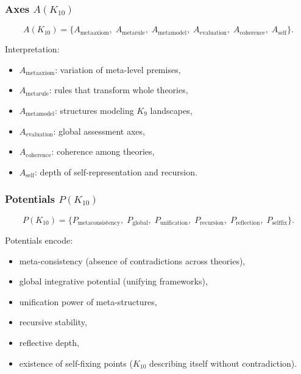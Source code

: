\subsubsection{Axes $A(K_{10})$}

\[
A(K_{10})=
\{
A_{\mathrm{metaaxiom}},\;
A_{\mathrm{metarule}},\;
A_{\mathrm{metamodel}},\;
A_{\mathrm{evaluation}},\;
A_{\mathrm{coherence}},\;
A_{\mathrm{self}}
\}.
\]

Interpretation:
\begin{itemize}
    \item $A_{\mathrm{metaaxiom}}$: variation of meta-level premises,
    \item $A_{\mathrm{metarule}}$: rules that transform whole theories,
    \item $A_{\mathrm{metamodel}}$: structures modeling $K_9$ landscapes,
    \item $A_{\mathrm{evaluation}}$: global assessment axes,
    \item $A_{\mathrm{coherence}}$: coherence among theories,
    \item $A_{\mathrm{self}}$: depth of self-representation and recursion.
\end{itemize}

\subsubsection{Potentials $P(K_{10})$}

\[
P(K_{10})=
\{
P_{\mathrm{metaconsistency}},\;
P_{\mathrm{global}},\;
P_{\mathrm{unification}},\;
P_{\mathrm{recursion}},\;
P_{\mathrm{reflection}},\;
P_{\mathrm{selffix}}
\}.
\]

Potentials encode:
\begin{itemize}
    \item meta-consistency (absence of contradictions across theories),
    \item global integrative potential (unifying frameworks),
    \item unification power of meta-structures,
    \item recursive stability,
    \item reflective depth,
    \item existence of self-fixing points ($K_{10}$ describing itself without contradiction).
\end{itemize}

